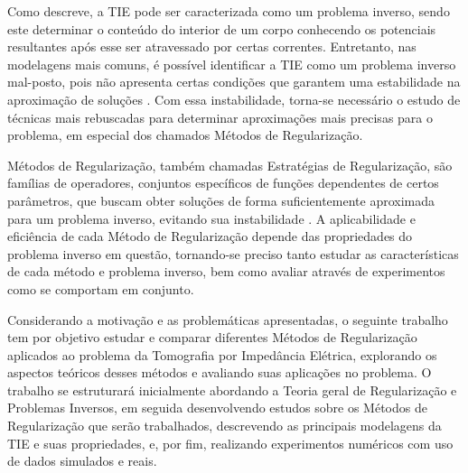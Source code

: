 Como  descreve, a TIE pode ser caracterizada como um problema inverso, sendo este determinar o conteúdo do interior de um corpo conhecendo os potenciais resultantes após esse ser atravessado por certas correntes. Entretanto, nas modelagens mais comuns, é possível identificar a TIE como um problema inverso mal-posto, pois não apresenta certas condições que garantem uma estabilidade na aproximação de soluções \cite{kirsch}. Com essa instabilidade, torna-se necessário o estudo de técnicas mais rebuscadas para determinar aproximações mais precisas para o problema, em especial dos chamados Métodos de Regularização.

Métodos de Regularização, também chamadas Estratégias de Regularização, são famílias de operadores, conjuntos específicos de funções dependentes de certos parâmetros, que buscam obter soluções de forma suficientemente aproximada para um problema inverso, evitando sua instabilidade \cite{kirsch}. A aplicabilidade e eficiência de cada Método de Regularização depende das propriedades do problema inverso em questão, tornando-se preciso tanto estudar as características de cada método e problema inverso, bem como avaliar através de experimentos como se comportam em conjunto.

Considerando a motivação e as problemáticas apresentadas, o seguinte trabalho tem por objetivo estudar e comparar diferentes Métodos de Regularização aplicados ao problema da Tomografia por Impedância Elétrica, explorando os aspectos teóricos desses métodos e avaliando suas aplicações no problema. O trabalho se estruturará inicialmente abordando a Teoria geral de Regularização e Problemas Inversos, em seguida desenvolvendo estudos sobre os Métodos de Regularização que serão trabalhados, descrevendo as principais modelagens da TIE e suas propriedades, e, por fim, realizando experimentos numéricos com uso de dados simulados e reais.
	
